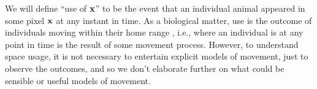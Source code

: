 \documentclass[12pt]{article}
\begin{document}


We will define ``use of ${\bf x}$'' to be the event that an individual
animal appeared in some pixel ${\bf x}$ at any instant in time.
As a biological matter, use is the outcome
of individuals moving within their home range
\citep{aarts_etal:2008,johnson_etal:2008,forester_etal:2009,hooten_etal:2010},
i.e., where an individual is at any point in time is the result of
some movement process. However, to understand space usage, it is not
necessary to entertain explicit models of movement, just to observe
the outcomes, and so we don't elaborate further on what could be
sensible or useful models of movement.

\end{document}
